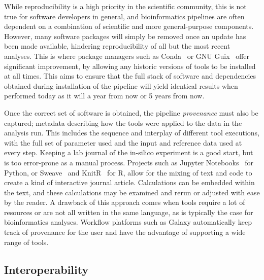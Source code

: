\begin{justify}
While reproducibility is a high priority in the scientific community, this is not true for software developers in general, and bioinformatics pipelines are often dependent on a combination of scientific and more general-purpose components. However, many software packages will simply be removed once an update has been made available, hindering reproducibility of all but the most recent analyses. This is where package managers such as Conda~\cite{conda} or GNU Guix~\cite{courtes2013functional} offer significant improvement, by allowing any historic versions of tools to be installed at all times. This aims to ensure that the full stack of software and dependencies obtained during installation of the pipeline will yield identical results when performed today as it will a year from now or 5 years from now.

Once the correct set of software is obtained, the pipeline \emph{provenance} must also be captured; metadata describing how the tools were applied to the data in the analysis run. This includes the sequence and interplay of different tool executions, with the full set of parameter used and the input and reference data used at every step. Keeping a lab journal of the in-silico experiment is a good start, but is too error-prone as a manual process. Projects such as Jupyter Notebooks~\cite{kluyver2016jupyter} for Python, or Sweave~\cite{leisch2002sweave} and KnitR~\cite{xie2014knitr} for R, allow for the mixing of text and code to create a kind of interactive journal article. Calculations can be embedded within the text, and these calculations may be examined and rerun or adjusted with ease by the reader. A drawback of this approach comes when tools require a lot of resources or are not all written in the same language, as is typically the case for bioinformatics analyses. Workflow platforms such as Galaxy automatically keep track of provenance for the user and have the advantage of supporting a wide range of tools.

\subsection{Interoperability}


\end{justify}
